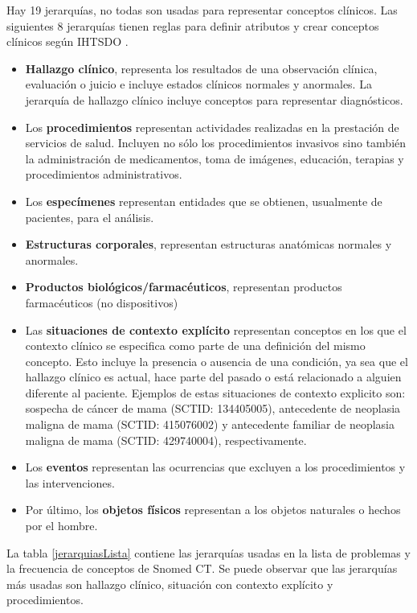 Hay 19 jerarquías, no todas son usadas para representar conceptos clínicos. Las siguientes 8 jerarquías tienen reglas para definir atributos y crear conceptos clínicos según \acrshort{IHTSDO} \cite{ihtsdo2016EG}.

\begin{itemize}
\item \textbf{Hallazgo clínico}, representa los resultados de una observación clínica, evaluación o juicio e incluye estados clínicos normales y anormales. La jerarquía de hallazgo clínico incluye conceptos para representar diagnósticos.
\item Los \textbf{procedimientos} representan actividades realizadas en la prestación de servicios de salud. Incluyen no sólo los procedimientos invasivos sino también la administración de medicamentos, toma  de imágenes, educación, terapias y procedimientos administrativos.
\item Los \textbf{especímenes} representan entidades que se obtienen, usualmente de pacientes, para el análisis.
\item \textbf{Estructuras corporales}, representan estructuras anatómicas normales y anormales.
\item \textbf{Productos biológicos/farmacéuticos}, representan productos farmacéuticos (no dispositivos)
\item Las \textbf{situaciones de contexto explícito} representan conceptos en los que el contexto clínico se especifica como parte de una definición del mismo concepto. Esto incluye la presencia o ausencia de una condición, ya sea que el hallazgo clínico es actual, hace parte del pasado o está relacionado a alguien diferente al paciente. Ejemplos de estas situaciones de contexto explicito son: sospecha de cáncer de mama (SCTID: 134405005), antecedente de neoplasia maligna de mama (SCTID: 415076002) y antecedente familiar de neoplasia maligna de mama (SCTID: 429740004), respectivamente.
\item Los \textbf{eventos} representan las ocurrencias que excluyen a los procedimientos y las intervenciones.
\item Por último, los \textbf{objetos físicos }representan a los objetos naturales o hechos por el hombre.
\end{itemize}
 
La tabla \ref{jerarquiasLista} contiene las jerarquías usadas en la lista de problemas y la frecuencia de conceptos de Snomed CT. Se puede observar que las jerarquías más usadas son hallazgo clínico, situación con contexto explícito y procedimientos.

